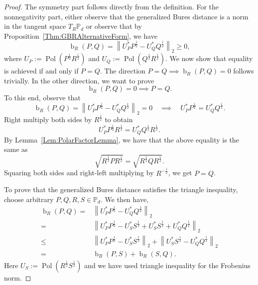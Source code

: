 \documentclass[10pt,a4paper]{amsart}
\begin{document}
\begin{proof}
    The symmetry part follows directly from the definition. For the nonnegativity part, either observe that the generalized Bures distance is a norm in the tangent space $T_R \mathbb P_d$ or observe that by Proposition~\ref{Thm:GBRAlternativeForm}, we have 
    \begin{equation}
        \operatorname{b}_R(P,Q) = \left\| U_P^* P^{\frac12}  - U_Q^* Q ^{\frac12} \right\|_2 \geq 0, 
    \end{equation}    
    where $U_P := \operatorname{Pol}\left(P^{\frac12}  R  ^{\frac12} \right)$ and $U_Q := \operatorname{Pol}\left(Q ^{\frac12} R  ^{\frac12} \right)$. We now show that equality is achieved if and only if $P = Q$. The direction $P=Q \implies \operatorname{b}_R(P,Q) = 0$ follows trivially. In the other direction, we want to prove
    \begin{equation}
        \operatorname{b}_R(P,Q) = 0 \implies P = Q.
    \end{equation}
    To this end, observe that
    \begin{equation}
        \operatorname{b}_R(P,Q) = \left\| U_P^* P^{\frac12}  - U_Q^* Q^{\frac12} \right\|_2 = 0 \quad \implies  \quad U_P^* P^{\frac12}  =  U_Q^* Q^{\frac12}. 
    \end{equation}
    Right multiply both sides by $R ^{\frac12} $ to obtain
    \begin{equation}
        U_P^* P^{\frac12}  R ^{\frac12} = U_Q^* Q ^{\frac12} R ^{\frac12}. 
    \end{equation}
    By Lemma~\ref{Lem:PolarFactorLemma}, we have that the above equality is the same as
    \begin{equation}
        \sqrt{R ^{\frac12} P R ^{\frac12} } = \sqrt{R ^{\frac12} Q R ^{\frac12} }.
    \end{equation}
    Squaring both sides and right-left multiplying by $ R^{-\frac12} $, we get $P = Q$.
    
    To prove that the generalized Bures distance satisfies the triangle inequality, choose arbitrary $P,Q,R,S \in \mathbb P_d$. We then have,
    \begin{equation}
    \begin{aligned}
        \operatorname{b}_R(P,Q) =  &\left\| U_P^* P^{\frac12}  - U_Q^* Q^{\frac12}   \right\|_2  \\ 
        = &\left\| U_P^* P^{\frac12}  - U_S^* S ^{\frac12} + U_S^* S ^{\frac12} +  U_Q^* Q^{\frac12} \right\|_2 \\ \leq & \left\| U_P^* P^{\frac12}  - U_S^* S ^{\frac12} \right\|_2 + \left\| U_S^* S ^{\frac12} - U_Q^* Q ^{\frac12} \right\|_2  \\ = &\operatorname{b}_R(P,S) + \operatorname{b}_R(S,Q).   
    \end{aligned}
    \end{equation} 
    Here $U_S := \operatorname{Pol}\left(R ^{\frac12} S ^{\frac12} \right)$ and we have used triangle inequality for the Frobenius norm.
\end{proof}
\end{document}
